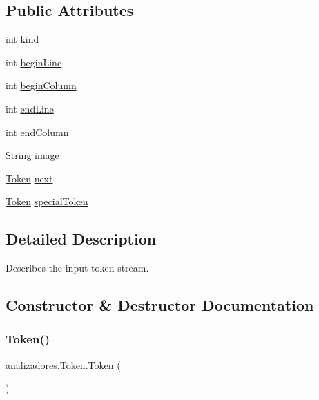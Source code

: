 \subsection*{Public Attributes}
\begin{DoxyCompactItemize}
\item 
int \mbox{\hyperlink{classanalizadores_1_1_token_ac5615b76c325a751915025aa28a03cfc}{kind}}
\item 
int \mbox{\hyperlink{classanalizadores_1_1_token_afaec87d0c77c8f37692f7b1061e2955a}{begin\+Line}}
\item 
int \mbox{\hyperlink{classanalizadores_1_1_token_a3274d7ca281b55d20fbdfad269762456}{begin\+Column}}
\item 
int \mbox{\hyperlink{classanalizadores_1_1_token_a37afccf406a7948b763ccb503afecc4f}{end\+Line}}
\item 
int \mbox{\hyperlink{classanalizadores_1_1_token_adc8a8b5671f861de75274cb8016064b9}{end\+Column}}
\item 
String \mbox{\hyperlink{classanalizadores_1_1_token_a3636b082aca90dcbd24df1790f847590}{image}}
\item 
\mbox{\hyperlink{classanalizadores_1_1_token}{Token}} \mbox{\hyperlink{classanalizadores_1_1_token_a7177e7c2f1387bb011e8602a52077126}{next}}
\item 
\mbox{\hyperlink{classanalizadores_1_1_token}{Token}} \mbox{\hyperlink{classanalizadores_1_1_token_a05c70c5bef44be3c3126ed5c267978fd}{special\+Token}}
\end{DoxyCompactItemize}


\subsection{Detailed Description}
Describes the input token stream. 

\subsection{Constructor \& Destructor Documentation}
\mbox{\label{classanalizadores_1_1_token_afe5ae37eb50ea338fa7159207f58ace9}} 
\subsubsection{\texorpdfstring{Token()}{Token()}\hspace{0.1cm}{\footnotesize\ttfamily [1/3]}}
{\footnotesize\ttfamily analizadores.\+Token.\+Token (\begin{DoxyParamCaption}{ }\end{DoxyParamCaption})}

